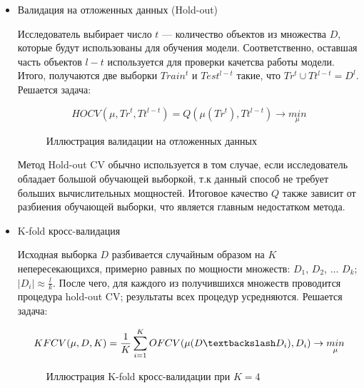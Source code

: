 \documentclass[a4paper, 14pt]{article}
\begin{document}
\label{CV_methods}
\begin{itemize}
	\item Валидация на отложенных данных (Hold-out)
	
	Исследователь выбирает число $t$ --- количество объектов из множества $D$, которые будут использованы для обучения модели. Соответственно, оставшая часть объектов $l - t$ используется для проверки качетсва работы модели. Итого, получаются две выборки $Train^t \text{ и } Test^{l-t}$ такие, что $Tr^t \cup Tt^{l-t} = D^l$. Решается задача:
	
	\[HOCV(\mu, Tr^t, Tt^{l-t}) = Q(\mu (Tr^t), Tt^{l-t}) \rightarrow \underset{\mu}{min} \] 
	
	\begin{figure}[h]
		\label{ris: ho}
		\caption{Иллюстрация валидации на отложенных данных}
	\end{figure}
	
	
	Метод Hold-out CV обычно используется в том случае, если исследователь обладает большой обучающей выборкой, т.к данный способ не требует больших вычислительных мощностей. Итоговое качество $Q$ также зависит от разбиения обучающей выборки, что является главным недостатком метода. 
	
	\item K-fold кросс-валидация 
	
	Исходная выборка $D$ разбивается случайным образом на $K$ непересекающихся, примерно равных по мощности множеств: $D_1$, $D_2$, $\dots$ $D_k$; $\left|D_i\right| \approx \frac{l}{k}$. После чего, для каждого из получившихся множеств проводится процедура hold-out CV; результаты всех процедур усредняются. Решается задача:
	
	\[KFCV(\mu, D, K) = \frac{1}{K} \sum_{i=1}^{K} OFCV(\mu(D \textbackslash D_i), D_i) \rightarrow \underset{\mu}{min} \]
	
	\begin{figure}[h]
		\label{ris: kfold}
		\caption{Иллюстрация K-fold кросс-валидации при $K=4$}
	\end{figure}
	

\end{itemize}
\end{document}
